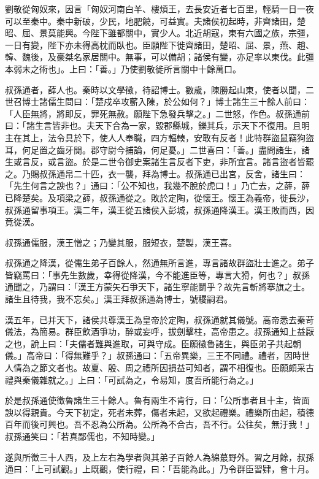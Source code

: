 \begin{pinyinscope}
劉敬從匈奴來，因言「匈奴河南白羊、樓煩王，去長安近者七百里，輕騎一日一夜可以至秦中。秦中新破，少民，地肥饒，可益實。夫諸侯初起時，非齊諸田，楚昭、屈、景莫能興。今陛下雖都關中，實少人。北近胡寇，東有六國之族，宗彊，一日有變，陛下亦未得高枕而臥也。臣願陛下徙齊諸田，楚昭、屈、景，燕、趙、韓、魏後，及豪桀名家居關中。無事，可以備胡；諸侯有變，亦足率以東伐。此彊本弱末之術也」。上曰：「善。」乃使劉敬徙所言關中十餘萬口。

叔孫通者，薛人也。秦時以文學徵，待詔博士。數歲，陳勝起山東，使者以聞，二世召博士諸儒生問曰：「楚戍卒攻蘄入陳，於公如何？」博士諸生三十餘人前曰：「人臣無將，將即反，罪死無赦。願陛下急發兵擊之。」二世怒，作色。叔孫通前曰：「諸生言皆非也。夫天下合為一家，毀郡縣城，鑠其兵，示天下不復用。且明主在其上，法令具於下，使人人奉職，四方輻輳，安敢有反者！此特群盜鼠竊狗盜耳，何足置之齒牙閒。郡守尉今捕論，何足憂。」二世喜曰：「善。」盡問諸生，諸生或言反，或言盜。於是二世令御史案諸生言反者下吏，非所宜言。諸言盜者皆罷之。乃賜叔孫通帛二十匹，衣一襲，拜為博士。叔孫通已出宮，反舍，諸生曰：「先生何言之諛也？」通曰：「公不知也，我幾不脫於虎口！」乃亡去，之薛，薛已降楚矣。及項梁之薛，叔孫通從之。敗於定陶，從懷王。懷王為義帝，徙長沙，叔孫通留事項王。漢二年，漢王從五諸侯入彭城，叔孫通降漢王。漢王敗而西，因竟從漢。

叔孫通儒服，漢王憎之；乃變其服，服短衣，楚製，漢王喜。

叔孫通之降漢，從儒生弟子百餘人，然通無所言進，專言諸故群盜壯士進之。弟子皆竊罵曰：「事先生數歲，幸得從降漢，今不能進臣等，專言大猾，何也？」叔孫通聞之，乃謂曰：「漢王方蒙矢石爭天下，諸生寧能鬬乎？故先言斬將搴旗之士。諸生且待我，我不忘矣。」漢王拜叔孫通為博士，號稷嗣君。

漢五年，已并天下，諸侯共尊漢王為皇帝於定陶，叔孫通就其儀號。高帝悉去秦苛儀法，為簡易。群臣飲酒爭功，醉或妄呼，拔劍擊柱，高帝患之。叔孫通知上益厭之也，說上曰：「夫儒者難與進取，可與守成。臣願徵魯諸生，與臣弟子共起朝儀。」高帝曰：「得無難乎？」叔孫通曰：「五帝異樂，三王不同禮。禮者，因時世人情為之節文者也。故夏、殷、周之禮所因損益可知者，謂不相復也。臣願頗采古禮與秦儀雜就之。」上曰：「可試為之，令易知，度吾所能行為之。」

於是叔孫通使徵魯諸生三十餘人。魯有兩生不肯行，曰：「公所事者且十主，皆面諛以得親貴。今天下初定，死者未葬，傷者未起，又欲起禮樂。禮樂所由起，積德百年而後可興也。吾不忍為公所為。公所為不合古，吾不行。公往矣，無汙我！」叔孫通笑曰：「若真鄙儒也，不知時變。」

遂與所徵三十人西，及上左右為學者與其弟子百餘人為綿蕞野外。習之月餘，叔孫通曰：「上可試觀。」上既觀，使行禮，曰：「吾能為此。」乃令群臣習肄，會十月。


\end{pinyinscope}
